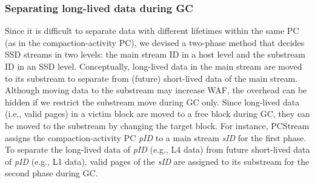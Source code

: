 \subsubsection{Separating long-lived data during GC}
Since it is difficult to separate data with different lifetimes within the same PC 
(as in the compaction-activity PC), we devised a two-phase method that decides SSD 
streams in two levels: the main stream ID in a host level and the substream ID in an SSD level.
Conceptually, long-lived data in the main stream are moved to its substream to 
separate from (future) short-lived data of the main stream.
Although moving data to the substream may increase WAF,
the overhead can be hidden if we restrict the substream move during GC only.
Since long-lived data (i.e., valid pages) in a victim block are moved to a free block during GC, 
they can be moved to the substream by changing the target block.
For instance, \textsf{\small PCStream} assigns the compaction-activity PC {\it pID} to a
main stream {\it sID} for the first phase.
To separate the long-lived data of {\it pID} (e.g., L4 data) 
from future short-lived data of {\it pID} (e.g., L1 data), 
valid pages of the {\it sID} are assigned to its substream for the second phase during GC.


